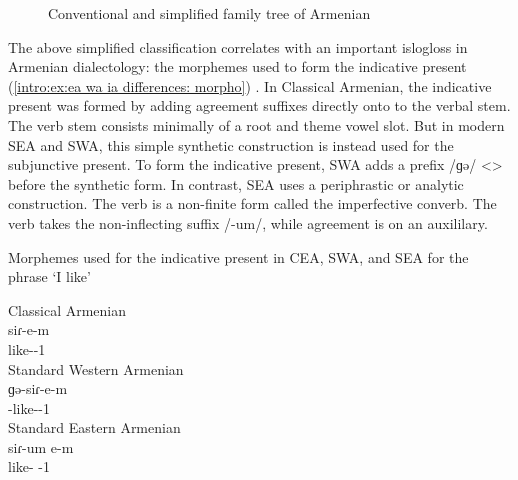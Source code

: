 \begin{figure}[H]
	\caption{Conventional and simplified family tree of Armenian}
	\label{tree:dialect:basic}
	\end{figure}

 
The above simplified classification correlates with an important islogloss in Armenian dialectology: the morphemes used to form the indicative present (\ref{intro:ex:ea wa ia differences: morpho}) \citep{Vaux-1995-ArmenianVerbDiachrony}. In Classical Armenian, the indicative present was formed by adding agreement suffixes directly onto to the verbal stem. The verb stem consists minimally of a root and theme vowel slot. But in modern SEA and SWA, this simple synthetic construction is instead used for the subjunctive present. To form the indicative present, SWA adds a prefix /ɡə/ <> before the synthetic form. In contrast, SEA uses a periphrastic or analytic construction. The verb is a non-finite form called the imperfective converb. The verb takes the non-inflecting suffix /-um/, while agreement is on an auxililary. 


\begin{exe}
	\ex Morphemes used for the indicative present in CEA, SWA, and SEA  for the phrase `I like' \label{intro:ex:ea wa ia differences: morpho}
	\begin{xlist}
		\ex Classical Armenian \\
		\gll   siɾ-e-m \\
		like-{\thgloss}-1{\sg} \\
		\trans {}
		\ex Standard Western Armenian \\
		\gll ɡə-siɾ-e-m \\
		{\ind}-like-{\thgloss}-1{\sg}\\
\trans {}
		\ex Standard Eastern Armenian \\
		\gll siɾ-um e-m \\
		like-{\impfcvb} {\aux}-1{\sg}\\
 \trans {}
	\end{xlist}
	
\end{exe} 




